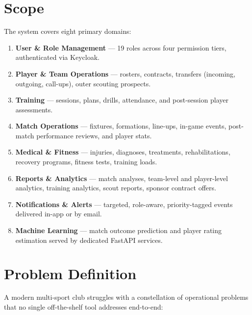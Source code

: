 \documentclass[12pt,a4paper,oneside]{report}
\begin{document}
\section{Scope}
The system covers eight primary domains:
\begin{enumerate}[leftmargin=*]
  \item \textbf{User \& Role Management} --- 19 roles across four
        permission tiers, authenticated via Keycloak.
  \item \textbf{Player \& Team Operations} --- rosters, contracts,
        transfers (incoming, outgoing, call-ups), outer scouting prospects.
  \item \textbf{Training} --- sessions, plans, drills, attendance, and
        post-session player assessments.
  \item \textbf{Match Operations} --- fixtures, formations, line-ups,
        in-game events, post-match performance reviews, and player stats.
  \item \textbf{Medical \& Fitness} --- injuries, diagnoses, treatments,
        rehabilitations, recovery programs, fitness tests, training loads.
  \item \textbf{Reports \& Analytics} --- match analyses, team-level and
        player-level analytics, training analytics, scout reports,
        sponsor contract offers.
  \item \textbf{Notifications \& Alerts} --- targeted, role-aware,
        priority-tagged events delivered in-app or by email.
  \item \textbf{Machine Learning} --- match outcome prediction and player
        rating estimation served by dedicated FastAPI services.
\end{enumerate}

\section{Problem Definition}
\label{sec:problem-definition}
A modern multi-sport club struggles with a constellation of operational
problems that no single off-the-shelf tool addresses end-to-end:
\end{document}
